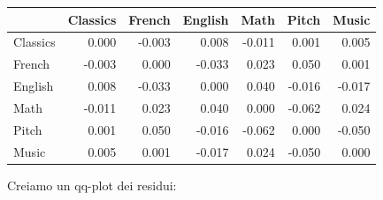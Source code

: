 \documentclass[
  11pt,
]{krantz}
\makeatletter
\newenvironment{Shaded}{\begin{snugshade}}{\end{snugshade}}
\newcommand{\AttributeTok}[1]{\textcolor[rgb]{0.61,0.61,0.61}{#1}}
\newcommand{\ConstantTok}[1]{\textcolor[rgb]{0,0,0}{#1}}
\newcommand{\DecValTok}[1]{\textcolor[rgb]{0.06,0.06,0.06}{#1}}
\newcommand{\FunctionTok}[1]{\textcolor[rgb]{0,0,0}{#1}}
\newcommand{\NormalTok}[1]{#1}
\newcommand{\OtherTok}[1]{\textcolor[rgb]{0.37,0.37,0.37}{#1}}
\newcommand{\SpecialCharTok}[1]{\textcolor[rgb]{0,0,0}{#1}}
\newcommand{\StringTok}[1]{\textcolor[rgb]{0.5,0.5,0.5}{#1}}
\newenvironment{kframe}{%
\medskip{}
\setlength{\fboxsep}{.8em}
 \def\at@end@of@kframe{}%
 \ifinner\ifhmode%
  \def\at@end@of@kframe{\end{minipage}}%
  \begin{minipage}{\columnwidth}%
 \fi\fi%
 \def\FrameCommand##1{\hskip\@totalleftmargin \hskip-\fboxsep
 \colorbox{shadecolor}{##1}\hskip-\fboxsep
     \hskip-\linewidth \hskip-\@totalleftmargin \hskip\columnwidth}%
 \MakeFramed {\advance\hsize-\width
   \@totalleftmargin\z@ \linewidth\hsize
   \@setminipage}}%
 {\par\unskip\endMakeFramed%
 \at@end@of@kframe}
\renewenvironment{Shaded}{\begin{kframe}}{\end{kframe}}
\theoremstyle{definition}
\theoremstyle{definition}
\theoremstyle{definition}
\theoremstyle{definition}
\theoremstyle{remark}
\makeatother
\begin{document}
\begin{Shaded}
\end{Shaded}

\begin{longtable}[]{@{}lrrrrrr@{}}
\toprule
& Classics & French & English & Math & Pitch & Music \\
\midrule
\endhead
Classics & 0.000 & -0.003 & 0.008 & -0.011 & 0.001 & 0.005 \\
French & -0.003 & 0.000 & -0.033 & 0.023 & 0.050 & 0.001 \\
English & 0.008 & -0.033 & 0.000 & 0.040 & -0.016 & -0.017 \\
Math & -0.011 & 0.023 & 0.040 & 0.000 & -0.062 & 0.024 \\
Pitch & 0.001 & 0.050 & -0.016 & -0.062 & 0.000 & -0.050 \\
Music & 0.005 & 0.001 & -0.017 & 0.024 & -0.050 & 0.000 \\
\bottomrule
\end{longtable}

Creiamo un qq-plot dei residui:

\begin{Shaded}
\end{Shaded}
\end{document}
